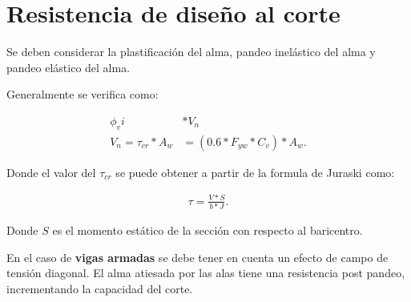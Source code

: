\documentclass[../main.tex]{subfiles}
\begin{document}
\section{Resistencia de diseño al corte}

Se deben considerar la plastificación del alma, pandeo inelástico del alma y
pandeo elástico del alma.

Generalmente se verifica como:

\begin{align*}
  \phi_v i &* V_n  \\[5pt]
  V_n = \tau_{cr} * A_w &= (0.6*F_{yw} * C_v)*A_w
.\end{align*}

Donde el valor del $\tau_{cr}$ se puede obtener a partir de la formula de
Juraski como:

\begin{align*}
  \tau = \frac{V*S}{b*J} 
.\end{align*}

Donde $S$ es el momento estático de la sección con respecto al baricentro.

En el caso de \textbf{vigas armadas} se debe tener en cuenta un efecto de campo
de tensión diagonal. El alma atiesada por las alas tiene una resistencia post
pandeo, incrementando la capacidad del corte.
\end{document}
